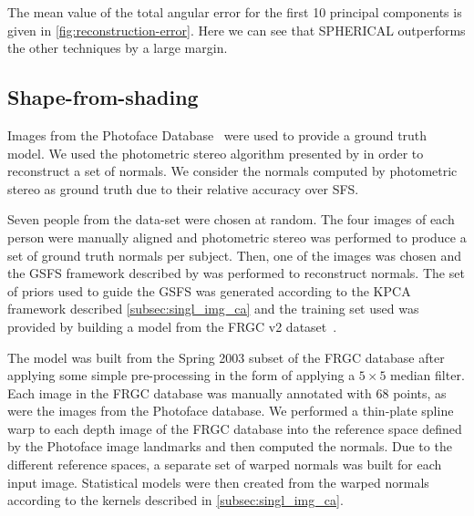 The mean value of the total angular error for the first 10 principal 
components is given in \cref{fig:reconstruction-error}. Here we can 
see that SPHERICAL outperforms the other techniques by a large margin.
\subsection{Shape-from-shading}
Images from the Photoface Database~\cite{zafeiriou2013photoface} were used to provide a 
ground truth model. We used the photometric stereo algorithm presented by 
\citet{barsky2003foursource} in order to reconstruct a set of normals. 
We consider the normals computed by photometric stereo as ground truth due to 
their relative accuracy over SFS\@.

Seven people from the data-set were chosen at random. The four images of each 
person were manually aligned and photometric stereo was performed to produce a
set of ground truth normals per subject. Then, one of the images was chosen 
and the GSFS framework described by \citet{smith2006recovering,smith2008facial}
was performed to reconstruct normals. The set of priors used to guide the GSFS 
was generated according to the KPCA framework described 
\cref{subsec:singl_img_ca} and the training set used was provided by 
building a model from the FRGC v2 dataset~\cite{phillips2005overview}.

The model was built from the Spring 2003 subset of the FRGC database after 
applying some simple pre-processing in the form of applying a $5 \times 5$ median 
filter. Each image in the FRGC 
database was manually annotated with 68 points, as were the images from the 
Photoface database. We performed a thin-plate spline warp to each depth image 
of the FRGC database into the reference space defined 
by the Photoface image landmarks and then computed the normals.
Due to the different reference spaces, a 
separate set of warped normals was built for each input image. Statistical 
models were then created from the warped normals according to the kernels 
described in \cref{subsec:singl_img_ca}.

